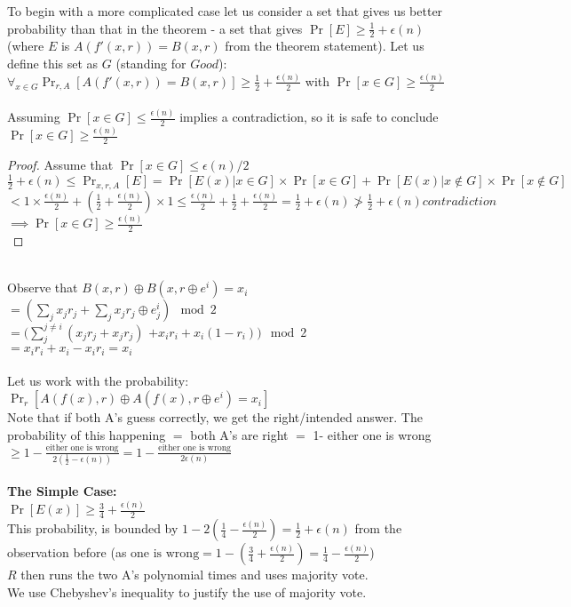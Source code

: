 To begin with a more complicated case let us consider a set that gives us better probability than that in the theorem - a set that gives $\Pr[E] \ge \frac{1}{2} + \epsilon(n)$ (where $E$ is $A(f'(x,r)) = B(x,r)$ from the theorem statement).
Let us define this set as $G$ (standing for $Good$):\\
$\forall_{x \in G} \Pr_{r,A}[A(f'(x,r)) = B(x,r)] \ge \frac{1}{2} + \frac{\epsilon(n)}{2}$ with $\Pr[x \in G] \ge \frac{\epsilon(n)}{2}$ \\
\\
Assuming $\Pr[x \in G] \le \frac{\epsilon(n)}{2}$ implies a contradiction, so it is safe to conclude $\Pr[x \in G] \ge \frac{\epsilon(n)}{2}$\\
\begin{proof}
Assume that $\Pr[x \in G] \le \epsilon(n)/2$\\
$\frac{1}{2}+\epsilon(n) \le \Pr_{x,r,A}[E] = \Pr[E(x) | x \in G] \times \Pr[x \in G] + \Pr[E(x) | x \notin G] \times \Pr[x \notin G]$\\
$< 1 \times \frac{\epsilon(n)}{2} + (\frac{1}{2}+\frac{\epsilon(n)}{2}) \times 1 \le \frac{\epsilon(n)}{2} + \frac{1}{2}+\frac{\epsilon(n)}{2} = \frac{1}{2}+ \epsilon(n) \not> \frac{1}{2}+ \epsilon(n) contradiction$\\
$\implies \Pr[x \in G] \ge \frac{\epsilon(n)}{2}$\\
\end{proof}
\\
	Observe that $B(x,r) \oplus B(x, r\oplus e^i) = x_i$\\
	$= (\sum_j x_j r_j + \sum_j x_j r_j \oplus e^i_j) \mod 2$\\
	$= (\sum_j^{j \not= i} (x_j r_j + x_j r_j)$  $+ x_i r_i + x_i (1-r_i)) \mod 2$\\
	$= x_i r_i + x_i - x_i r_i = x_i$\\\\

Let us work with the probability: $\Pr_{r}[A(f(x), r) \oplus A(f(x), r \oplus e^i) = x_i]$\\
		Note that if both A's guess correctly, we get the right/intended answer.
		The probability of this happening $=$ both A's are right $=$ 1- either one is wrong $\ge  1-\frac{\text{either one is wrong}}{2 (\frac{1}{2}-\epsilon(n))} = 1 - \frac{\text{either one is wrong}}{2 \epsilon(n)}$\\\\
\textbf{The Simple Case:}\\
	$\Pr[E(x)] \ge \frac{3}{4}+\frac{\epsilon(n)}{2}$\\
	This probability, is bounded by $1-2(\frac{1}{4} - \frac{\epsilon(n)}{2}) = \frac{1}{2} + \epsilon(n)$ from the observation before (as $\text{one is wrong} = 1- (\frac{3}{4}+\frac{\epsilon(n)}{2}) = \frac{1}{4} - \frac{\epsilon(n)}{2}$)\\
	$R$ then runs the two A's polynomial times and uses majority vote.\\
	We use Chebyshev's inequality to justify the use of majority vote.

